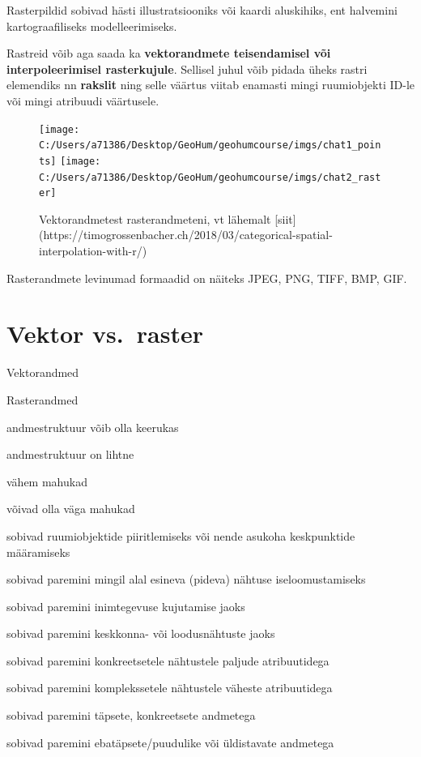\documentclass[
]{book}
\begin{document}
Rasterpildid sobivad hästi illustratsiooniks või kaardi aluskihiks, ent halvemini kartograafiliseks modelleerimiseks.

Rastreid võib aga saada ka \textbf{vektorandmete teisendamisel või interpoleerimisel rasterkujule}. Sellisel juhul võib pidada üheks rastri elemendiks nn \textbf{rakslit} ning selle väärtus viitab enamasti mingi ruumiobjekti ID-le või mingi atribuudi väärtusele.

\begin{figure}

{\centering \texttt{[image: C:/Users/a71386/Desktop/GeoHum/geohumcourse/imgs/chat1\_points]} \texttt{[image: C:/Users/a71386/Desktop/GeoHum/geohumcourse/imgs/chat2\_raster]} 

}

\caption{Vektorandmetest rasterandmeteni, vt lähemalt [siit](https://timogrossenbacher.ch/2018/03/categorical-spatial-interpolation-with-r/)}\label{fig:german-dialects}
\end{figure}

Rasterandmete levinumad formaadid on näiteks JPEG, PNG, TIFF, BMP, GIF.

\hypertarget{vektor-vs.-raster}{%
\section{Vektor vs.~raster}\label{vektor-vs.-raster}}

Vektorandmed

Rasterandmed

andmestruktuur võib olla keerukas

andmestruktuur on lihtne

vähem mahukad

võivad olla väga mahukad

sobivad ruumiobjektide piiritlemiseks või nende asukoha keskpunktide määramiseks

sobivad paremini mingil alal esineva (pideva) nähtuse iseloomustamiseks

sobivad paremini inimtegevuse kujutamise jaoks

sobivad paremini keskkonna- või loodusnähtuste jaoks

sobivad paremini konkreetsetele nähtustele paljude atribuutidega

sobivad paremini komplekssetele nähtustele väheste atribuutidega

sobivad paremini täpsete, konkreetsete andmetega

sobivad paremini ebatäpsete/puudulike või üldistavate andmetega
\end{document}
